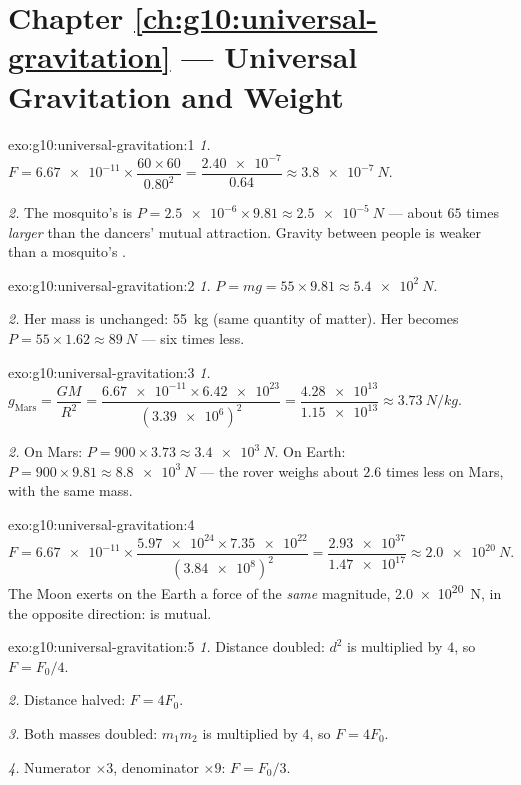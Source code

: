 \section*{Chapter \ref{ch:g10:universal-gravitation} --- Universal Gravitation and Weight}

\begin{solution}{exo:g10:universal-gravitation:1}
\emph{1.} $F = \num{6.67e-11} \times \dfrac{60 \times 60}{0.80^2}
= \dfrac{\num{2.40e-7}}{0.64} \approx \qty{3.8e-7}{N}$.

\emph{2.} The mosquito's  is
$P = \num{2.5e-6} \times 9.81 \approx \qty{2.5e-5}{N}$ --- about $65$
times \emph{larger} than the dancers' mutual attraction. Gravity
between people is weaker than a mosquito's .
\end{solution}

\begin{solution}{exo:g10:universal-gravitation:2}
\emph{1.} $P = mg = 55 \times 9.81 \approx \qty{5.4e2}{N}$.

\emph{2.} Her mass is unchanged: \qty{55}{kg} (same quantity of
matter). Her  becomes
$P = 55 \times 1.62 \approx \qty{89}{N}$ --- six times less.
\end{solution}

\begin{solution}{exo:g10:universal-gravitation:3}
\emph{1.} $g_{\text{Mars}} = \dfrac{G M}{R^2}
= \dfrac{\num{6.67e-11} \times \num{6.42e23}}{(\num{3.39e6})^2}
= \dfrac{\num{4.28e13}}{\num{1.15e13}} \approx \qty{3.73}{N/kg}$.

\emph{2.} On Mars: $P = 900 \times 3.73 \approx \qty{3.4e3}{N}$. On
Earth: $P = 900 \times 9.81 \approx \qty{8.8e3}{N}$ --- the rover
weighs about $2.6$ times less on Mars, with the same mass.
\end{solution}

\begin{solution}{exo:g10:universal-gravitation:4}
\[
F = \num{6.67e-11} \times
\frac{\num{5.97e24} \times \num{7.35e22}}{(\num{3.84e8})^2}
= \frac{\num{2.93e37}}{\num{1.47e17}}
\approx \qty{2.0e20}{N}.
\]
The Moon exerts on the Earth a force of the \emph{same} magnitude,
\qty{2.0e20}{N}, in the opposite direction:  is mutual.
\end{solution}

\begin{solution}{exo:g10:universal-gravitation:5}
\emph{1.} Distance doubled: $d^2$ is multiplied by $4$, so
$F = F_0/4$.

\emph{2.} Distance halved: $F = 4F_0$.

\emph{3.} Both masses doubled: $m_1 m_2$ is multiplied by $4$, so
$F = 4F_0$.

\emph{4.} Numerator $\times 3$, denominator $\times 9$:
$F = F_0/3$.
\end{solution}

